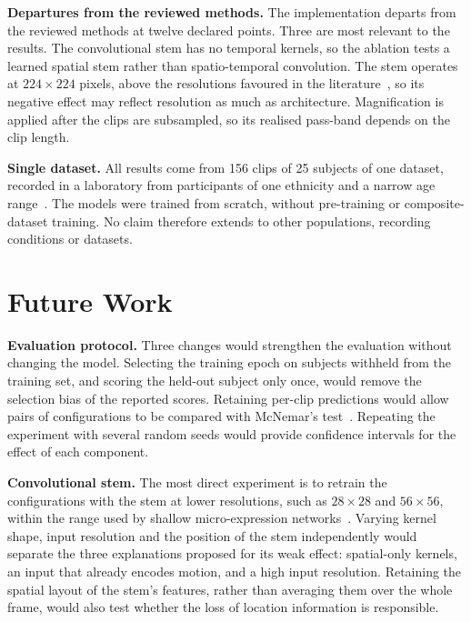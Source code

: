 \textbf{Departures from the reviewed methods.} The implementation departs from the reviewed methods at twelve declared points. Three are most relevant to the results. The convolutional stem has no temporal kernels, so the ablation tests a learned spatial stem rather than spatio-temporal convolution. The stem operates at $224\times224$ pixels, above the resolutions favoured in the literature~\cite{xia2020b}, so its negative effect may reflect resolution as much as architecture. Magnification is applied after the clips are subsampled, so its realised pass-band depends on the clip length.

\textbf{Single dataset.} All results come from 156 clips of 25 subjects of one dataset, recorded in a laboratory from participants of one ethnicity and a narrow age range~\cite{yan2014,davison2018}. The models were trained from scratch, without pre-training or composite-dataset training. No claim therefore extends to other populations, recording conditions or datasets.


\section{Future Work}
\label{sec:further-work}

\textbf{Evaluation protocol.} Three changes would strengthen the evaluation without changing the model. Selecting the training epoch on subjects withheld from the training set, and scoring the held-out subject only once, would remove the selection bias of the reported scores. Retaining per-clip predictions would allow pairs of configurations to be compared with McNemar's test~\cite{mcnemar1947}. Repeating the experiment with several random seeds would provide confidence intervals for the effect of each component.

\textbf{Convolutional stem.} The most direct experiment is to retrain the configurations with the stem at lower resolutions, such as $28\times28$ and $56\times56$, within the range used by shallow micro-expression networks~\cite{liong2019b,xia2020b}. Varying kernel shape, input resolution and the position of the stem independently would separate the three explanations proposed for its weak effect: spatial-only kernels, an input that already encodes motion, and a high input resolution. Retaining the spatial layout of the stem's features, rather than averaging them over the whole frame, would also test whether the loss of location information is responsible.

